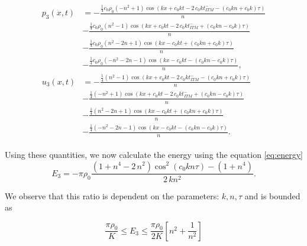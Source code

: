 \begin{align}
    \begin{split}
        p_3\left(x, t\right) & = -\frac{{\frac{1}{4}c_{0}\rho_{0}\left( -n^{2} + 1\right)} \cos\left(k x + c_{0} k t - 2 \, c_{0} k \mathit{t_{ITM}^-} - {\left(c_{0} k n + c_{0} k\right)} \tau\right)}{n} \\
        & - \frac{{\frac{1}{4}c_0\rho_0\left(n^{2} - 1\right)} \cos\left(k x + c_{0} k t - 2 \, c_{0} k \mathit{t_{ITM}^-} + {\left(c_{0} k n - c_{0} k\right)} \tau\right)}{n} \\
        & - \frac{{\frac{1}{4}c_0\rho_0\left(n^{2} - 2n + 1\right)} \cos\left(kx -c_{0} k t + {\left(c_{0} k n + c_{0} k\right)} \tau\right)}{n} \\
        & - \frac{{\frac{1}{4}c_0\rho_0\left(-n^{2} - 2n - 1\right)} \cos\left(kx-c_{0} k t - {\left(c_{0} k n - c_{0} k\right)} \tau\right)}{n}, \\
        u_3\left(x, t\right) & =  -\frac{{\frac{1}{4}\left(n^{2} - 1\right)} \cos\left( k x + c_{0} k t - 2 \, c_{0} k \mathit{t_{ITM}^-} - {\left(c_{0} k n + c_{0} k\right)} \tau\right)}{n} \\
        & - \frac{{\frac{1}{4}\left(-n^{2} + 1\right)} \cos\left(kx + c_{0} k t - 2 \, c_{0} k \mathit{t_{ITM}^-} + {\left(c_{0} k n - c_{0} k\right)} \tau\right)}{n} \\
        & - \frac{{\frac{1}{4}\left(n^{2} - 2n + 1\right)} \cos\left(kx -c_{0} k t + {\left(c_{0} k n + c_{0} k\right)} \tau\right)}{n} \\
        & - \frac{{\frac{1}{4}\left(-n^{2} - 2n - 1\right)} \cos\left(kx -c_{0} k t - {\left(c_{0} k n - c_{0} k\right)} \tau\right)}{n} .
    \end{split}
\end{align}

Using these quantities, we now calculate the energy using the equation \ref{eq:energy}
\begin{equation}
    E_3 = -\pi \rho_0\frac{{\left(1 + n^{4} - 2 \, n^{2}\right)} \cos^{2}\left(c_{0} k n \tau\right) - {\left(1 + n^{4}\right)}}{2 \, k n^{2}}.
\end{equation}

We observe that this ratio is dependent on the parameters: $k, n, \tau$ and is bounded as

\begin{equation}
    \frac{\pi \rho_0}{K} \leq E_3 \leq \frac{\pi \rho_0}{2K}\left[n^2 + \frac{1}{n^2}\right]
\end{equation}

